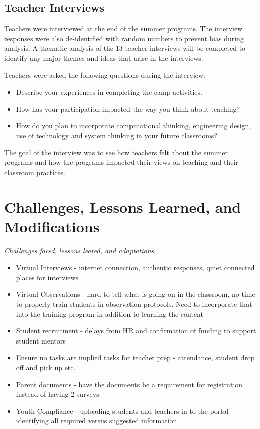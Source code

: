 \documentclass[
]{article}
\providecommand{\tightlist}{%
  \setlength{\itemsep}{0pt}\setlength{\parskip}{0pt}}
\begin{document}
\hypertarget{teacher-interviews}{%
\subsection{Teacher Interviews}\label{teacher-interviews}}

Teachers were interviewed at the end of the summer programs. The
interview responses were also de-identified with random numbers to
prevent bias during analysis. A thematic analysis of the 13 teacher
interviews will be completed to identify any major themes and ideas that
arise in the interviews.

Teachers were asked the following questions during the interview:

\begin{itemize}
\tightlist
\item
  Describe your experiences in completing the camp activities.
\item
  How has your participation impacted the way you think about teaching?
\item
  How do you plan to incorporate computational thinking, engineering
  design, use of technology and system thinking in your future
  classrooms?
\end{itemize}

The goal of the interview was to see how teachers felt about the summer
programs and how the programs impacted their views on teaching and their
classroom practices.

\hypertarget{challenges-lessons-learned-and-modifications}{%
\section{Challenges, Lessons Learned, and
Modifications}\label{challenges-lessons-learned-and-modifications}}

\emph{Challenges faced, lessons leared, and adaptations.}

\begin{itemize}
\tightlist
\item
  Virtual Interviews - internet connection, authentic responses, quiet
  connected places for interviews
\item
  Virtual Observations - hard to tell what is going on in the classroom,
  no time to properly train students in observation protocols. Need to
  incorporate that into the training program in addition to learning the
  content
\item
  Student recruitment - delays from HR and confirmation of funding to
  support student mentors
\item
  Ensure no tasks are implied tasks for teacher prep - attendance,
  student drop off and pick up etc.
\item
  Parent documents - have the documents be a requirement for
  registration instead of having 2 surveys
\item
  Youth Compliance - uploading students and teachers in to the portal -
  identifying all required versus suggested information
\end{itemize}
\end{document}
